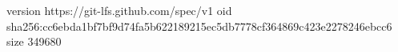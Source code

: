 version https://git-lfs.github.com/spec/v1
oid sha256:cc6ebda1bf7bf9d74fa5b622189215ec5db7778cf364869c423e2278246ebcc6
size 349680
